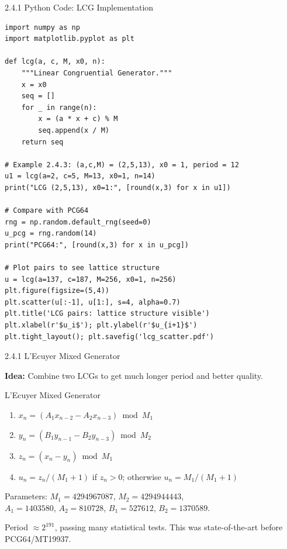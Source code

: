 \documentclass[aspectratio=169,10pt]{beamer}
\begin{document}
\begin{frame}[fragile]{2.4.1 Python Code: LCG Implementation}

\begin{lstlisting}[style=python]
import numpy as np
import matplotlib.pyplot as plt

def lcg(a, c, M, x0, n):
    """Linear Congruential Generator."""
    x = x0
    seq = []
    for _ in range(n):
        x = (a * x + c) % M
        seq.append(x / M)
    return seq

# Example 2.4.3: (a,c,M) = (2,5,13), x0 = 1, period = 12
u1 = lcg(a=2, c=5, M=13, x0=1, n=14)
print("LCG (2,5,13), x0=1:", [round(x,3) for x in u1])

# Compare with PCG64
rng = np.random.default_rng(seed=0)
u_pcg = rng.random(14)
print("PCG64:", [round(x,3) for x in u_pcg])

# Plot pairs to see lattice structure
u = lcg(a=137, c=187, M=256, x0=1, n=256)
plt.figure(figsize=(5,4))
plt.scatter(u[:-1], u[1:], s=4, alpha=0.7)
plt.title('LCG pairs: lattice structure visible')
plt.xlabel(r'$u_i$'); plt.ylabel(r'$u_{i+1}$')
plt.tight_layout(); plt.savefig('lcg_scatter.pdf')
\end{lstlisting}

\end{frame}

\begin{frame}[allowframebreaks]{2.4.1 L'Ecuyer Mixed Generator}

\textbf{Idea:} Combine two LCGs to get much longer period and better quality.

\begin{block}{L'Ecuyer Mixed Generator}
\begin{enumerate}
  \item $x_n = (A_1 x_{n-2} - A_2 x_{n-3}) \bmod M_1$
  \item $y_n = (B_1 y_{n-1} - B_2 y_{n-3}) \bmod M_2$
  \item $z_n = (x_n - y_n) \bmod M_1$
  \item $u_n = z_n/(M_1+1)$ if $z_n > 0$; otherwise $u_n = M_1/(M_1+1)$
\end{enumerate}
Parameters: $M_1 = 4294967087$, $M_2 = 4294944443$,\\
$A_1 = 1403580$, $A_2 = 810728$, $B_1 = 527612$, $B_2 = 1370589$.
\end{block}

Period $\approx 2^{191}$, passing many statistical tests. This was state-of-the-art
before PCG64/MT19937.

\end{frame}
\end{document}
